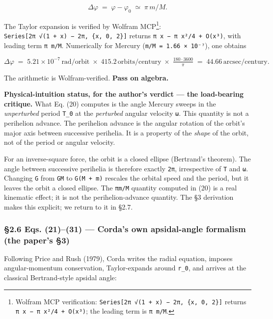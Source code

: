 \documentclass[
  11pt,
]{article}
\begin{document}
\[
\Delta\varphi \;=\; \varphi - \varphi_{0} \;\simeq\; \pi\,m/M. \tag{20}
\]

The Taylor expansion is verified by Wolfram MCP\footnote{Wolfram MCP
  verification:
  \texttt{Series{[}2π\ √(1\ +\ x)\ −\ 2π,\ \{x,\ 0,\ 2\}{]}} returns
  \texttt{π\ x\ −\ π\ x²/4\ +\ O(x³)}; the leading term is
  \texttt{π\ m/M}.}:
\texttt{Series{[}2π\ √(1\ +\ x)\ −\ 2π,\ \{x,\ 0,\ 2\}{]}} returns
\texttt{π\ x\ −\ π\ x²/4\ +\ O(x³)}, with leading term \texttt{π\ m/M}.
Numerically for Mercury (\texttt{m/M\ =\ 1.66\ ×\ 10⁻⁷}), one obtains

\[
\Delta\varphi \;=\; 5.21 \times 10^{-7}\,\text{rad/orbit}
\;\times\; 415.2\,\text{orbits/century}
\;\times\; \tfrac{180 \cdot 3600}{\pi}
\;=\; 44.66\,\text{arcsec/century}. \tag{R1}
\]

The arithmetic is Wolfram-verified. \textbf{Pass on algebra.}

\textbf{Physical-intuition status, for the author's verdict --- the
load-bearing critique.} What Eq. (20) computes is the angle Mercury
sweeps in the \emph{unperturbed} period \texttt{T\_0} at the
\emph{perturbed} angular velocity \texttt{ω}. This quantity is not a
perihelion advance. The perihelion advance is the angular rotation of
the orbit's major axis between successive perihelia. It is a property of
the \emph{shape} of the orbit, not of the period or angular velocity.

For an inverse-square force, the orbit is a closed ellipse (Bertrand's
theorem). The angle between successive perihelia is therefore exactly
\texttt{2π}, irrespective of \texttt{T} and \texttt{ω}. Changing
\texttt{G} from \texttt{GM} to \texttt{G(M\ +\ m)} rescales the orbital
speed and the period, but it leaves the orbit a closed ellipse. The
\texttt{πm/M} quantity computed in (20) is a real kinematic effect; it
is not the perihelion-advance quantity. The §3 derivation makes this
explicit; we return to it in §2.7.

\hypertarget{eqs.-2131-cordas-own-apsidal-angle-formalism-the-papers-3}{%
\subsubsection{§2.6 Eqs. (21)--(31) --- Corda's own apsidal-angle
formalism (the paper's
§3)}\label{eqs.-2131-cordas-own-apsidal-angle-formalism-the-papers-3}}

Following Price and Rush (1979), Corda writes the radial equation,
imposes angular-momentum conservation, Taylor-expands around
\texttt{r\_0}, and arrives at the classical Bertrand-style apsidal
angle:
\end{document}
